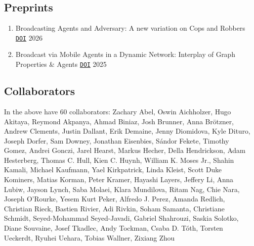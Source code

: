 \documentclass[letterpaper,11pt]{article}
\makeatletter
\newcommand{\resumeSubHeadingListStart}{\begin{itemize}[leftmargin=*]}
\newcommand{\resumeSubHeadingListEnd}{\end{itemize}}
\newcommand{\resumeOneLine}[2]{%
  \item[] #1 #2
}
\newcommand{\pdficon}{\faFilePdf}
\newcommand{\doilabel}{\texttt{DOI}}
\makeatother
\begin{document}
    \subsection*{Preprints}%
  
    \begin{enumerate}
    \setcounter{enumi}{\value{pubnum}}
      
        \resumeOneLine{Broadcasting Agents and Adversary: A new variation on Cops and Robbers%
\quad\href{https://arxiv.org/pdf/2603.11958}{\pdficon}%
%
\quad\href{https://doi.org/10.48550/arXiv.2603.11958}{\doilabel}%
        }{2026}
 \vspace{-.5em}  
      
        \resumeOneLine{Broadcast via Mobile Agents in a Dynamic Network: Interplay of Graph Properties \& Agents%
\quad\href{https://arxiv.org/pdf/2504.05442}{\pdficon}%
%
\quad\href{https://doi.org/10.48550/arXiv.2504.05442}{\doilabel}%
        }{2025}
 
    \setcounter{pubnum}{\value{enumi}}
    \end{enumerate}

\subsection*{Collaborators}
In the above have 60 collaborators:
Zachary Abel, Oswin Aichholzer, Hugo Akitaya, Reymond Akpanya, Ahmad Biniaz, Josh Brunner, Anna Brötzner, Andrew Clements, Justin Dallant, Erik Demaine, Jenny Diomidova, Kyle Dituro, Joseph Dorfer, Sam Downey, Jonathan Eisenbies, Sándor Fekete, Timothy Gomez, Andrei Gonczi, Jarel Hearst, Markus Hecher, Della Hendrickson, Adam Hesterberg, Thomas C. Hull, Kien C. Huynh, William K. Moses Jr., Shahin Kamali, Michael Kaufmann, Yael Kirkpatrick, Linda Kleist, Scott Duke Kominers, Matias Korman, Peter Kramer, Hayashi Layers, Jeffery Li, Anna Lubiw, Jayson Lynch, Saba Molaei, Klara Mundilova, Ritam Nag, Chie Nara, Joseph O'Rourke, Yesem Kurt Peker, Alfredo J. Perez, Amanda Redlich, Christian Rieck, Bastien Rivier, Adi Rivkin, Soham Samanta, Christiane Schmidt, Seyed-Mohammad Seyed-Javadi, Gabriel Shahrouzi, Saskia Solotko, Diane Souvaine, Josef Tkadlec, Andy Tockman, Csaba D. Tóth, Torsten Ueckerdt, Ryuhei Uehara, Tobias Wallner, Zixiang Zhou

\end{document}
